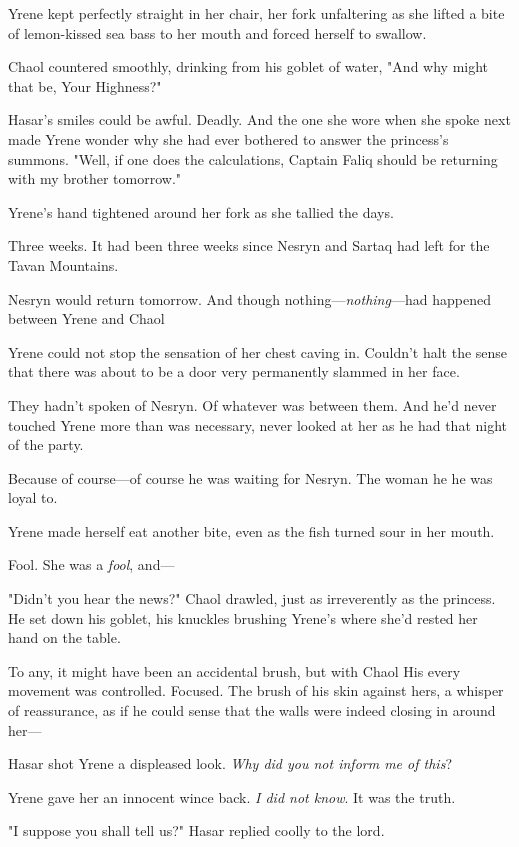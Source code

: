 Yrene kept perfectly straight in her chair, her fork unfaltering as she lifted a bite of lemon-kissed sea bass to her mouth and forced herself to swallow.

Chaol countered smoothly, drinking from his goblet of water, "And why might that be, Your Highness?"

Hasar's smiles could be awful.
Deadly.
And the one she wore when she spoke next made Yrene wonder why she had ever bothered to answer the princess's summons.
"Well, if one does the calculations, Captain Faliq should be returning with my brother tomorrow."

Yrene's hand tightened around her fork as she tallied the days.

Three weeks.
It had been three weeks since Nesryn and Sartaq had left for the Tavan Mountains.

Nesryn would return tomorrow.
And though nothing---\emph{nothing}---had happened between Yrene and Chaol 

Yrene could not stop the sensation of her chest caving in.
Couldn't halt the sense that there was about to be a door very permanently slammed in her face.

They hadn't spoken of Nesryn.
Of whatever was between them.
And he'd never touched Yrene more than was necessary, never looked at her as he had that night of the party.

Because of course---of course he was waiting for Nesryn.
The woman he  he was loyal to.

Yrene made herself eat another bite, even as the fish turned sour in her mouth.

Fool.
She was a \emph{fool}, and---

"Didn't you hear the news?"
Chaol drawled, just as irreverently as the princess.
He set down his goblet, his knuckles brushing Yrene's where she'd rested her hand on the table.

To any, it might have been an accidental brush, but with Chaol 
His every movement was controlled.
Focused.
The brush of his skin against hers, a whisper of reassurance, as if he could sense that the walls were indeed closing in around her---

Hasar shot Yrene a displeased look.
\emph{Why did you not inform me of this}?

Yrene gave her an innocent wince back.
\emph{I did not know}.
It was the truth.

"I suppose you shall tell us?"
Hasar replied coolly to the lord.

